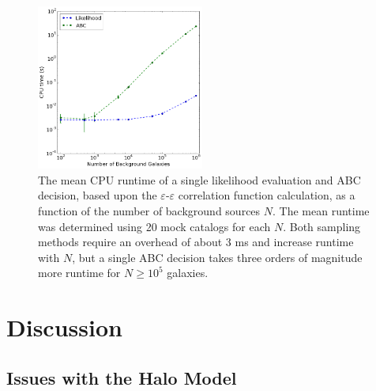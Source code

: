 \documentclass[%
 reprint,
 amsmath,amssymb,
 aps,nofootinbib
]{revtex4-1}
\begin{document}
\begin{figure}
    \centering
    \includegraphics[width=0.49\textwidth]{figs-swe/thesis/mle_vs_abc.png}
    \captionsetup{justification=raggedright,singlelinecheck=false}
    \caption{The mean CPU runtime of a single likelihood evaluation and ABC decision, based upon the $\varepsilon$-$\varepsilon$ correlation function calculation, as a function of the number of background sources $N$. The mean runtime was determined using 20 mock catalogs for each $N$. Both sampling methods require an overhead of about 3 ms and increase runtime with $N$, but a single ABC decision takes three orders of magnitude more runtime for $N\geq10^5$ galaxies.}
    \label{fig:mle_vs_abc}
\end{figure}

\section{Discussion} \label{discussion}


\subsection{Issues with the Halo Model} \label{issues}
\end{document}
